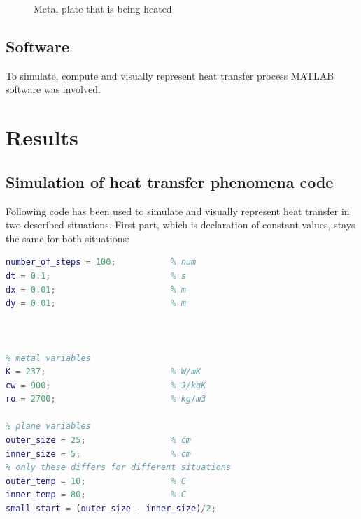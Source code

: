 \documentclass[onecolumn]{article}
\begin{document}
\begin{figure}[H]
\noindent{}
\caption{Metal plate that is being heated}
\label{fig:plate}
\end{figure}


\subsection{Software}
To simulate, compute and visually represent heat transfer process MATLAB software was involved.

\section{Results}
\subsection{Simulation of heat transfer phenomena code}
Following code has been used to simulate and visually represent heat transfer in two described situations. First part, which is declaration of constant values, stays the same for both situations:
\begin{lstlisting}[language=Matlab,frame=single,label={lst:autocorr},breaklines=true,caption={initial values for matlab scripts}]
% time variables
number_of_steps = 100;           % num
dt = 0.1;                        % s
dx = 0.01;                       % m
dy = 0.01;                       % m



% metal variables
K = 237;                         % W/mK
cw = 900;                        % J/kgK
ro = 2700;                       % kg/m3

% plane variables
outer_size = 25;                 % cm
inner_size = 5;                  % cm
% only these differs for different situations
outer_temp = 10;                 % C
inner_temp = 80;                 % C
small_start = (outer_size - inner_size)/2;
\end{lstlisting}
\end{document}
